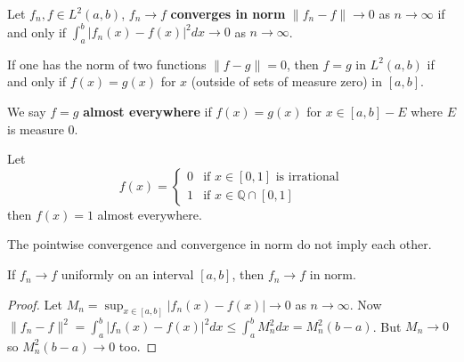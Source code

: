 
\begin{defn}
Let $f_n,f\in L^{2}(a,b)$, $f_n\to f$ \textbf{converges in
  norm}  $\|f_n-f\|\to0$ as
$n\to\infty$ if and only if
$\int^{b}_{a}|f_{n}(x)-f(x)|^2dx\to0$ as $n\to\infty$.
\end{defn}

\begin{rmk} 
If one has the norm of two functions $\|f-g\|=0$, then $f=g$
in $L^{2}(a,b)$ if and only if $f(x)=g(x)$ for $x$ (outside
of sets of measure zero) in $[a,b]$.
\end{rmk}

\begin{defn}
We say $f=g$ \textbf{almost everywhere} if $f(x)=g(x)$ for
$x\in[a,b]-E$ where $E$ is measure 0.
\end{defn}

\begin{ex}
Let
\begin{equation}
f(x) = \begin{cases} 0 & \text{if } x\in[0,1]\text{ is
    irrational}\\
1 & \text{if }x\in\mathbb{Q}\cap[0,1]\end{cases}
\end{equation}
then $f(x)=1$ almost everywhere.
\end{ex}

\begin{rmk}
The pointwise convergence and convergence in norm do not
imply each other.
\end{rmk}

\begin{thm}
If $f_n\to f$ uniformly on an interval $[a,b]$, then $f_n\to
f$ in norm.
\end{thm}
\begin{proof}
Let $M_n = \sup_{x\in[a,b]}|f_{n}(x)-f(x)|\to 0$ as
$n\to\infty$. Now
$\|f_n-f\|^2=\int^{b}_{a}|f_{n}(x)-f(x)|^{2}dx\leq\int^{b}_{a}M_{n}^{2}dx=M_{n}^{2}(b-a)$. But
$M_{n}\to 0$ so $M_{n}^{2}(b-a)\to 0$ too.
\end{proof}

